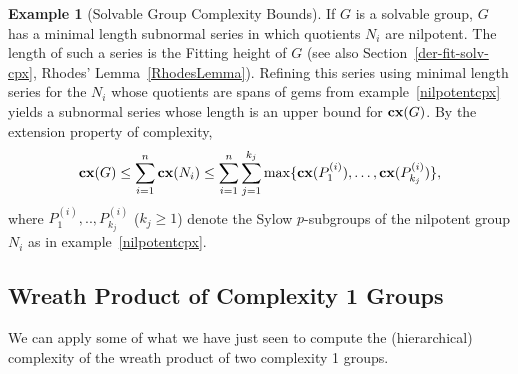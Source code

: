 \documentclass[a4paper,11pt]{amsart}
\theoremstyle{definition}
\newtheorem{example}{Example}
\newcommand{\cx}{\mbox{\bf cx}}
\newcommand{\1}{{\mathbf 1}}
\begin{document}
\begin{example}[Solvable Group Complexity Bounds]
If $G$ is a solvable group, $G$ has a minimal length subnormal series in which quotients $N_i$ are nilpotent. The length of such a series is 
the Fitting height of $G$  (see also Section~\ref{der-fit-solv-cpx}, Rhodes' Lemma~\ref{RhodesLemma}). 
Refining this series using  minimal length series for the $N_i$ whose quotients are spans of gems from example~\ref{nilpotentcpx} yields a subnormal series whose length is an upper bound for $\cx(G)$.
By the extension property  of complexity,
$$\cx(G)\leq \sum_{i=1}^n \cx(N_i)  \leq \sum_{i=1}^n\sum_{j=1}^{k_j} \max\{\cx(P_1^{(i)}), \ldots , \cx(P_{k_j}^{(i)})\},$$
where $P_1^{(i)}, .., P_{k_j}^{(i)}$ ($k_j\geq 1$) denote the Sylow $p$-subgroups of the nilpotent group $N_i$ as in example~\ref{nilpotentcpx}. 
\end{example}

 
\subsection{Wreath Product of Complexity 1 Groups}

We can apply some of what we have just seen to compute the (hierarchical) complexity of the wreath product of two complexity 1 groups.
\end{document}
